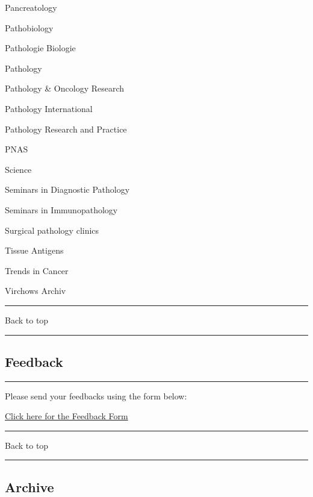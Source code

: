 \documentclass[]{article}
\begin{document}
Pancreatology

Pathobiology

Pathologie Biologie

Pathology

Pathology \& Oncology Research

Pathology International

Pathology Research and Practice

PNAS

Science

Seminars in Diagnostic Pathology

Seminars in Immunopathology

Surgical pathology clinics

Tissue Antigens

Trends in Cancer

Virchows Archiv

\begin{center}\rule{0.5\linewidth}{\linethickness}\end{center}

Back to top

\begin{center}\rule{0.5\linewidth}{\linethickness}\end{center}

\pagebreak

\hypertarget{feedback}{%
\subsection{Feedback}\label{feedback}}

\begin{center}\rule{0.5\linewidth}{\linethickness}\end{center}

Please send your feedbacks using the form below:

\href{https://docs.google.com/forms/d/e/1FAIpQLSeD3Z9J6Y7eMmiyM12f_SfAmHUlykb1zxZcwO6lg7cebGYQIQ/viewform}{Click
here for the Feedback Form}

\begin{center}\rule{0.5\linewidth}{\linethickness}\end{center}

Back to top

\begin{center}\rule{0.5\linewidth}{\linethickness}\end{center}

\pagebreak

\hypertarget{archive}{%
\subsection{Archive}\label{archive}}
\end{document}
